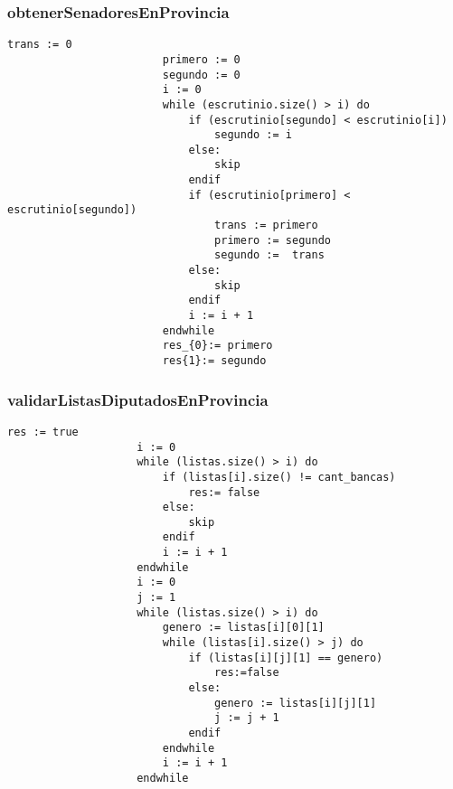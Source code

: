 \documentclass[10pt,a4paper]{article}
\begin{document}
		\subsubsection{obtenerSenadoresEnProvincia}
			\begin{minipage}[t]{\textwidth}
				\begin{lstlisting}[caption={()},label=code:for]
						trans := 0
						primero := 0
						segundo := 0
						i := 0
						while (escrutinio.size() > i) do
							if (escrutinio[segundo] < escrutinio[i])
								segundo := i
							else:
								skip
							endif
							if (escrutinio[primero] < escrutinio[segundo])
								trans := primero
								primero := segundo
								segundo :=  trans
							else:
								skip
							endif
							i := i + 1
						endwhile	
						res_{0}:= primero
                        res{1}:= segundo
				\end{lstlisting}
			\end{minipage}
	
		\subsubsection{validarListasDiputadosEnProvincia}
			\begin{minipage}[t]{\textwidth}
				\begin{lstlisting}[caption={()},label=code:for]
					res := true
					i := 0
					while (listas.size() > i) do
						if (listas[i].size() != cant_bancas) 
							res:= false
						else:
							skip
						endif
						i := i + 1
					endwhile
					i := 0
					j := 1
					while (listas.size() > i) do
						genero := listas[i][0][1]
						while (listas[i].size() > j) do
							if (listas[i][j][1] == genero) 
								res:=false
							else:
								genero := listas[i][j][1]
								j := j + 1
							endif
						endwhile
						i := i + 1
					endwhile
				\end{lstlisting}
			\end{minipage}
		
\end{document}
